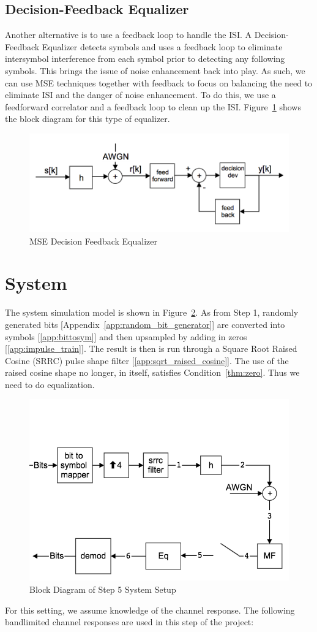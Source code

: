 \documentclass[]{article}
\begin{document}
\subsection{Decision-Feedback Equalizer}
\label{sec:dfe}
Another alternative is to use a feedback loop to handle the ISI.  A Decision-Feedback Equalizer detects symbols and uses a feedback loop to eliminate intersymbol interference from each symbol prior to detecting any following symbols.  This brings the issue of noise enhancement back into play.  As such, we can use MSE techniques together with feedback to focus on balancing the need to eliminate ISI and the danger of noise enhancement.  To do this, we use a feedforward correlator and a feedback loop to clean up the ISI.  Figure~\ref{fig:dfe} shows the block diagram for this type of equalizer. 

\begin{figure}[H]
\centering
\includegraphics[width=.6\textwidth]{mse_dfe.png}
\caption{MSE Decision Feedback Equalizer\label{fig:dfe}}
\end{figure}

\newpage
\section{System}
\label{sec:system}
The system simulation model is shown in Figure~\ref{fig:step5}.  As from Step 1, randomly generated bits [Appendix~\ref{app:random_bit_generator}] are converted into symbols [\ref{app:bittosym}] and then upsampled by adding in zeros [\ref{app:impulse_train}].  The result is then is run through a Square Root Raised Cosine (SRRC) pulse shape filter [\ref{app:sqrt_raised_cosine}].  The use of the raised cosine shape no longer, in itself, satisfies Condition~\ref{thm:zero}.  Thus we need to do equalization.
\begin{figure}[H]
\centering
\includegraphics[width=.6\textwidth]{step5.png}
\caption{Block Diagram of Step 5 System Setup\label{fig:step5}}
\end{figure}
For this setting, we assume knowledge of the channel response. The following bandlimited channel responses are used in this step of the project:
\end{document}
